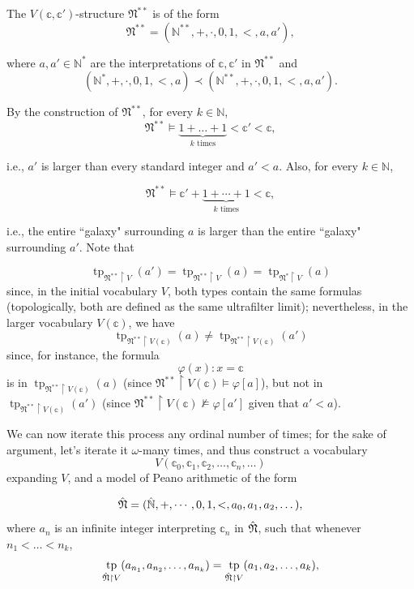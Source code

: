 \documentclass{scrartcl}
\DeclareMathOperator{\tp}{tp}
\renewcommand{\phi}{\varphi}
\begin{document}
\begin{example}
The $V(\mathbb{c},\mathbb{c}')$-structure $\mathfrak{N}^{**}$ is of the form
\[
\mathfrak{N}^{**}=(\mathbb{N}^{**},+,\cdot,0,1,<,a, a'),
\]

where $a, a'\in\mathbb{N}^*$ are the interpretations of $\mathbb{c},\mathbb{c}'$ in  $\mathfrak{N}^{**}$ and
\[
(\mathbb{N}^{*},+,\cdot,0,1,<,a)
\prec
(\mathbb{N}^{**},+,\cdot,0,1,<,a,a').
\]

By the construction of $\mathfrak{N}^{**}$, for every $k\in\mathbb{N}$,
\[
\mathfrak{N}^{**}\models \underbrace{1+\dots+1}_{k\text{ times}}< \mathbb{c}'<\mathbb{c},
\]

i.e., $a'$ is larger than every standard integer and  $a'<a$. Also, for every $k\in\mathbb{N}$,

\[
\mathfrak{N}^{**}\models \mathbb{c}'+\underbrace{1+\cdots+1}_{k\text{ times}}<\mathbb{c},
\]

i.e., the entire ``galaxy" surrounding $a$ is larger than the entire ``galaxy" surrounding $a'$. Note that

\[
\tp_{\mathfrak{N}^{**}\upharpoonright V}(a')
=
\tp_{\mathfrak{N}^{**}\upharpoonright V}(a)
=
\tp_{\mathfrak{N}^{*}\upharpoonright V}(a)
\]
since, in the initial vocabulary $V$, both types contain the same formulas (topologically, both are defined as the same ultrafilter limit); nevertheless, in the larger vocabulary $V(\mathbb c)$, we have
\[
\tp_{\mathfrak{N}^{**}\upharpoonright V(\mathbb c)}(a)\neq
\tp_{\mathfrak{N}^{**}\upharpoonright V(\mathbb c)}(a')
\]
since, for instance, the formula
\[
\phi(x) : x=\mathbb c
\] 
is in $\tp_{\mathfrak{N}^{**}\upharpoonright V(\mathbb c) }(a)$ (since $\mathfrak{N}^{**}\upharpoonright V(\mathbb c)\models \phi[a]$), but not in $\tp_{\mathfrak{N}^{**}\upharpoonright V(\mathbb c)}(a')$ (since
$\mathfrak{N}^{**}\upharpoonright V(\mathbb c)\not\models \phi[a']$ given that $a'<a$).

We can now iterate this process any ordinal number of times; for the sake of argument, let's iterate it $\omega$-many times, and thus construct a vocabulary
\[
V(\mathbb{c}_0,\mathbb{c}_1,\mathbb{c}_2,\dots,\mathbb{c}_n, \dots)
\]
expanding $V$, and a model of Peano arithmetic of the form

\[
\Hat{\mathfrak{N}}=(\Hat{\mathbb{N}},+,\cdots,0,1,<,a_0, a_1, a_2,\dots),
\]
where $a_n$ is an infinite integer interpreting $\mathbb{c}_n$ in $\Hat{\mathfrak{N}}$, such that whenever  $n_1<\dots <n_k$,
\[
\tp_{\Hat{\mathfrak{N}}\upharpoonright V}(a_{n_1}, a_{n_2}, \dots, a_{n_k})
=
\tp_{\Hat{\mathfrak{N}}\upharpoonright V} (a_1, a_2, \dots, a_k),
\]


\end{example}
\end{document}
